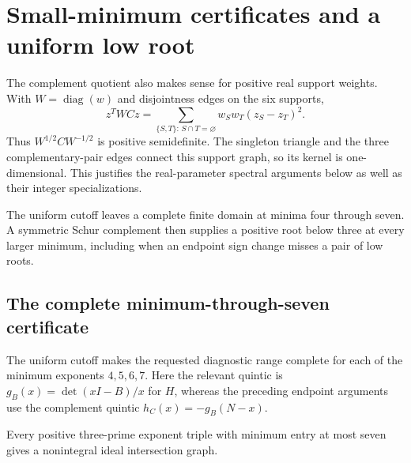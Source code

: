 \section{Small-minimum certificates and a uniform low root}
\label{sec:low-spectrum}
The complement quotient also makes sense for positive real support weights.
With $W=\operatorname{diag}(w)$ and disjointness edges on the six supports,
\[
 z^TWCz=\sum_{\{S,T\}:\,S\cap T=\varnothing}w_Sw_T(z_S-z_T)^2.
\]
Thus $W^{1/2}CW^{-1/2}$ is positive semidefinite. The singleton triangle
and the three complementary-pair edges connect this support graph, so
its kernel is one-dimensional. This justifies the real-parameter spectral
arguments below as well as their integer specializations.

The uniform cutoff leaves a complete finite domain at minima four through
seven. A symmetric Schur complement then supplies a positive root below
three at every larger minimum, including when an endpoint sign change
misses a pair of low roots.

\subsection{The complete minimum-through-seven certificate}

The uniform cutoff makes the requested diagnostic range complete for each
of the minimum exponents $4,5,6,7$. Here the relevant quintic is
$g_B(x)=\det(xI-B)/x$ for $H$, whereas the preceding endpoint arguments
use the complement quintic $h_C(x)=-g_B(N-x)$.

\begin{corollary}
\label{cor:minimum-seven}
Every positive three-prime exponent triple with minimum entry at most
seven gives a nonintegral ideal intersection graph.
\end{corollary}

